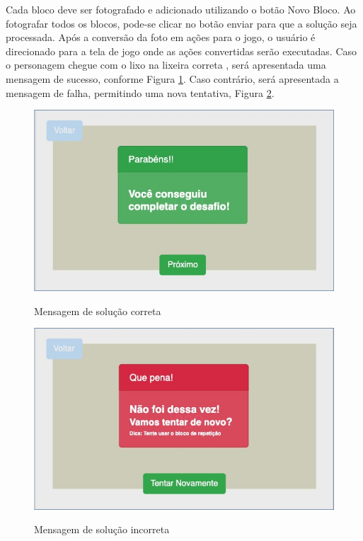     Cada bloco deve ser fotografado e adicionado utilizando o botão Novo Bloco.
    Ao fotografar todos os blocos, pode-se clicar no botão enviar para que a solução seja processada.
    Após a conversão da foto em ações para o jogo, o usuário é direcionado para a tela de jogo onde as ações convertidas serão executadas.
    Caso o personagem chegue com o lixo na lixeira correta , será apresentada uma mensagem de sucesso, conforme Figura \ref{figura:solucao_correta}. Caso contrário, será apresentada a mensagem de falha, permitindo uma nova tentativa, Figura \ref{figura:solucao_incorreta}.
    
    \begin{figure}[H]
        \caption{Mensagem de solução correta}
        \centering
        \includegraphics[width=\linewidth]{Imagens/Cap3/solucao_correta.jpg}
        \label{figura:solucao_correta}
    \end{figure}
    
    \begin{figure}[H]
        \caption{Mensagem de solução incorreta}
        \centering
        \includegraphics[width=\linewidth]{Imagens/Cap3/solucao_incorreta.jpg}
        \label{figura:solucao_incorreta}
    \end{figure}
    
